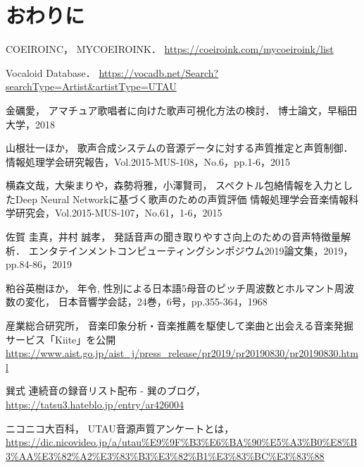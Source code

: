 \documentclass[a4j,8pt,twocolumn]{extarticle}
\begin{document}
\section{おわりに}

\begin{thebibliography}{9}
COEIROINC，
MYCOEIROINK．
\url{https://coeiroink.com/mycoeiroink/list}

Vocaloid Database．
\url{https://vocadb.net/Search?searchType=Artist&artistType=UTAU}

金礪愛，
アマチュア歌唱者に向けた歌声可視化方法の検討．
博士論文，早稲田大学，2018

山根壮一ほか，
歌声合成システムの音源データに対する声質推定と声質制御．
情報処理学会研究報告，Vol.2015-MUS-108，No.6，pp.1-6，2015

横森文哉，大柴まりや，森勢将雅，小澤賢司，
スペクトル包絡情報を入力としたDeep Neural Networkに基づく歌声のための声質評価
情報処理学会音楽情報科学研究会，Vol.2015-MUS-107，No.61，1-6，2015

佐賀 圭真，井村 誠孝，
発話音声の聞き取りやすさ向上のための音声特徴量解析．
エンタテインメントコンピューティングシンポジウム2019論文集，2019，pp.84-86，2019

粕谷英樹ほか，
年令, 性別による日本語5母音のピッチ周波数とホルマント周波数の変化，
日本音響学会誌，24巻，6号，pp.355-364，1968

産業総合研究所，
音楽印象分析・音楽推薦を駆使して楽曲と出会える音楽発掘サービス「Kiite」を公開
\url{https://www.aist.go.jp/aist_j/press_release/pr2019/pr20190830/pr20190830.html}

巽式 連続音の録音リスト配布 - 巽のブログ，
\url{https://tatsu3.hateblo.jp/entry/ar426004}

ニコニコ大百科，
UTAU音源声質アンケートとは，
\url{https://dic.nicovideo.jp/a/utau%E9%9F%B3%E6%BA%90%E5%A3%B0%E8%B3%AA%E3%82%A2%E3%83%B3%E3%82%B1%E3%83%BC%E3%83%88}

\end{thebibliography}


\end{document}
